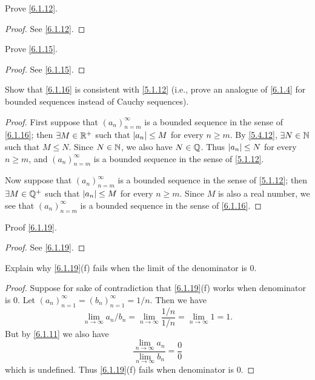 \begin{ex}\label{ex:6.1.5}
  Prove \cref{6.1.12}.
\end{ex}

\begin{proof}
  See \cref{6.1.12}.
\end{proof}

\begin{ex}\label{ex:6.1.6}
  Prove \cref{6.1.15}.
\end{ex}

\begin{proof}
  See \cref{6.1.15}.
\end{proof}

\begin{ex}\label{ex:6.1.7}
  Show that \cref{6.1.16} is consistent with \cref{5.1.12}
  (i.e., prove an analogue of \cref{6.1.4} for bounded sequences instead of Cauchy sequences).
\end{ex}

\begin{proof}
  First suppose that \((a_n)_{n = m}^\infty\) is a bounded sequence in the sense of \cref{6.1.16};
  then \(\exists M \in \mathbb{R}^+\) such that \(\left\lvert a_n\right\rvert \leq M\) for every \(n \geq m\).
  By \cref{5.4.12}, \(\exists N \in \mathbb{N}\) such that \(M \leq N\).
  Since \(N \in \mathbb{N}\), we also have \(N \in \mathbb{Q}\).
  Thus \(\left\lvert a_n\right\rvert \leq N\) for every \(n \geq m\), and \((a_n)_{n = m}^\infty\) is a bounded sequence in the sense of \cref{5.1.12}.

  Now suppose that \((a_n)_{n = m}^\infty\) is a bounded sequence in the sense of \cref{5.1.12};
  then \(\exists M \in \mathbb{Q}^+\) such that \(\left\lvert a_n\right\rvert \leq M\) for every \(n \geq m\).
  Since \(M\) is also a real number, we see that \((a_n)_{n = m}^\infty\) is a bounded sequence in the sense of \cref{6.1.16}.
\end{proof}

\begin{ex}\label{ex:6.1.8}
  Proof \cref{6.1.19}.
\end{ex}

\begin{proof}
  See \cref{6.1.19}.
\end{proof}

\begin{ex}\label{ex:6.1.9}
  Explain why \cref{6.1.19}(f) fails when the limit of the denominator is \(0\).
\end{ex}

\begin{proof}
  Suppose for sake of contradiction that \cref{6.1.19}(f) works when denominator is \(0\).
  Let \((a_n)_{n = 1}^\infty = (b_n)_{n = 1}^\infty = 1 / n\).
  Then we have
  \[
    \lim_{n \to \infty} a_n / b_n = \lim_{n \to \infty} \dfrac{1 / n}{1 / n} = \lim_{n \to \infty} 1 = 1.
  \]
  But by \cref{6.1.11} we also have
  \[
    \dfrac{\lim_{n \to \infty} a_n}{\lim_{n \to \infty} b_n} = \dfrac{0}{0}
  \]
  which is undefined.
  Thus \cref{6.1.19}(f) fails when denominator is \(0\).
\end{proof}

